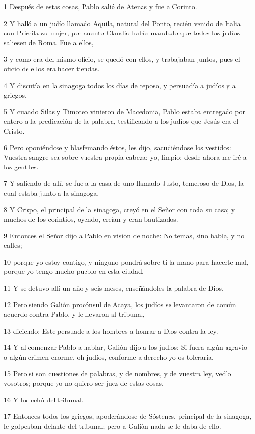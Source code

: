 \par 1 Después de estas cosas, Pablo salió de Atenas y fue a Corinto.
\par 2 Y halló a un judío llamado Aquila, natural del Ponto, recién venido de Italia con Priscila su mujer, por cuanto Claudio había mandado que todos los judíos saliesen de Roma. Fue a ellos,
\par 3 y como era del mismo oficio, se quedó con ellos, y trabajaban juntos, pues el oficio de ellos era hacer tiendas.
\par 4 Y discutía en la sinagoga todos los días de reposo, y persuadía a judíos y a griegos.
\par 5 Y cuando Silas y Timoteo vinieron de Macedonia, Pablo estaba entregado por entero a la predicación de la palabra, testificando a los judíos que Jesús era el Cristo.
\par 6 Pero oponiéndose y blasfemando éstos, les dijo, sacudiéndose los vestidos: Vuestra sangre sea sobre vuestra propia cabeza; yo, limpio; desde ahora me iré a los gentiles.
\par 7 Y saliendo de allí, se fue a la casa de uno llamado Justo, temeroso de Dios, la cual estaba junto a la sinagoga.
\par 8 Y Crispo, el principal de la sinagoga, creyó en el Señor con toda su casa; y muchos de los corintios, oyendo, creían y eran bautizados.
\par 9 Entonces el Señor dijo a Pablo en visión de noche: No temas, sino habla, y no calles;
\par 10 porque yo estoy contigo, y ninguno pondrá sobre ti la mano para hacerte mal, porque yo tengo mucho pueblo en esta ciudad.
\par 11 Y se detuvo allí un año y seis meses, enseñándoles la palabra de Dios.
\par 12 Pero siendo Galión procónsul de Acaya, los judíos se levantaron de común acuerdo contra Pablo, y le llevaron al tribunal,
\par 13 diciendo: Este persuade a los hombres a honrar a Dios contra la ley.
\par 14 Y al comenzar Pablo a hablar, Galión dijo a los judíos: Si fuera algún agravio o algún crimen enorme, oh judíos, conforme a derecho yo os toleraría.
\par 15 Pero si son cuestiones de palabras, y de nombres, y de vuestra ley, vedlo vosotros; porque yo no quiero ser juez de estas cosas.
\par 16 Y los echó del tribunal.
\par 17 Entonces todos los griegos, apoderándose de Sóstenes, principal de la sinagoga, le golpeaban delante del tribunal; pero a Galión nada se le daba de ello.
